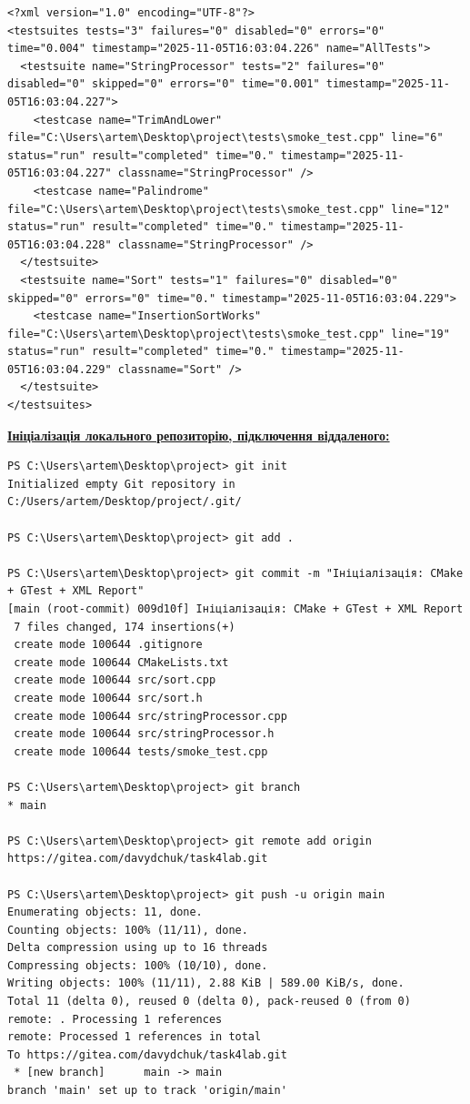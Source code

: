 \documentclass[12pt,a4paper]{article}
\begin{document}
    \begin{verbatim}
<?xml version="1.0" encoding="UTF-8"?>
<testsuites tests="3" failures="0" disabled="0" errors="0" time="0.004" timestamp="2025-11-05T16:03:04.226" name="AllTests">
  <testsuite name="StringProcessor" tests="2" failures="0" disabled="0" skipped="0" errors="0" time="0.001" timestamp="2025-11-05T16:03:04.227">
    <testcase name="TrimAndLower" file="C:\Users\artem\Desktop\project\tests\smoke_test.cpp" line="6" status="run" result="completed" time="0." timestamp="2025-11-05T16:03:04.227" classname="StringProcessor" />
    <testcase name="Palindrome" file="C:\Users\artem\Desktop\project\tests\smoke_test.cpp" line="12" status="run" result="completed" time="0." timestamp="2025-11-05T16:03:04.228" classname="StringProcessor" />
  </testsuite>
  <testsuite name="Sort" tests="1" failures="0" disabled="0" skipped="0" errors="0" time="0." timestamp="2025-11-05T16:03:04.229">
    <testcase name="InsertionSortWorks" file="C:\Users\artem\Desktop\project\tests\smoke_test.cpp" line="19" status="run" result="completed" time="0." timestamp="2025-11-05T16:03:04.229" classname="Sort" />
  </testsuite>
</testsuites>
    \end{verbatim}

    \textbf{\underline{Ініціалізація локального репозиторію, підключення віддаленого:}}

    \begin{verbatim}
PS C:\Users\artem\Desktop\project> git init 
Initialized empty Git repository in C:/Users/artem/Desktop/project/.git/

PS C:\Users\artem\Desktop\project> git add .

PS C:\Users\artem\Desktop\project> git commit -m "Ініціалізація: CMake + GTest + XML Report" 
[main (root-commit) 009d10f] Ініціалізація: CMake + GTest + XML Report
 7 files changed, 174 insertions(+)
 create mode 100644 .gitignore
 create mode 100644 CMakeLists.txt
 create mode 100644 src/sort.cpp
 create mode 100644 src/sort.h
 create mode 100644 src/stringProcessor.cpp
 create mode 100644 src/stringProcessor.h
 create mode 100644 tests/smoke_test.cpp

PS C:\Users\artem\Desktop\project> git branch 
* main

PS C:\Users\artem\Desktop\project> git remote add origin https://gitea.com/davydchuk/task4lab.git

PS C:\Users\artem\Desktop\project> git push -u origin main 
Enumerating objects: 11, done.
Counting objects: 100% (11/11), done.
Delta compression using up to 16 threads
Compressing objects: 100% (10/10), done.
Writing objects: 100% (11/11), 2.88 KiB | 589.00 KiB/s, done.
Total 11 (delta 0), reused 0 (delta 0), pack-reused 0 (from 0)
remote: . Processing 1 references
remote: Processed 1 references in total
To https://gitea.com/davydchuk/task4lab.git
 * [new branch]      main -> main
branch 'main' set up to track 'origin/main'
    \end{verbatim}
\end{document}
